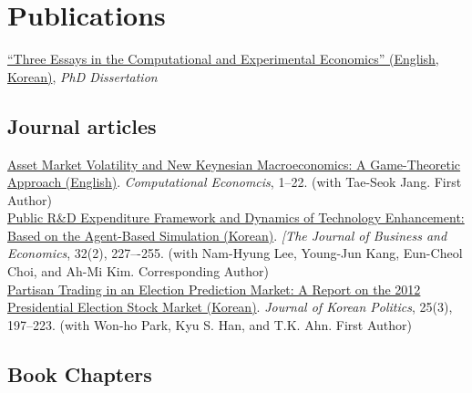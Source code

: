 \documentclass[11pt, a4paper]{article} %
\newcommand{\years}[1]{\marginnote{\scriptsize #1}} %
\begin{document}
%


\section*{Publications}

\years{2012} \href{http://spsm.snu.ac.kr/namun/papers/phDdraft.full.pdf}{``Three Essays in the Computational and Experimental Economics'' (English, Korean)}, \emph{PhD Dissertation}\\

\subsection*{Journal articles}

\years{2017} \href{https://link.springer.com/article/10.1007/s10614-017-9705-5}{Asset Market Volatility and New Keynesian Macroeconomics: A Game-Theoretic Approach (English)}. \emph{Computational Economcis}, 1--22. (with Tae-Seok Jang. First Author)\\
\years{2016} \href{http://www.earticle.net/article.aspx?sn=278619}{Public R\&D Expenditure Framework and Dynamics of Technology Enhancement: Based on the Agent-Based Simulation (Korean)}. \emph{[The Journal of Business and Economics}, 32(2), 227–-255. (with Nam-Hyung Lee, Young-Jun Kang, Eun-Cheol Choi, and Ah-Mi Kim. Corresponding Author)\\
\years{2016}\href{https://www.kci.go.kr/kciportal/ci/sereArticleSearch/ciSereArtiView.kci?sereArticleSearchBean.artiId=ART002164687}{Partisan Trading in an Election Prediction Market: A Report on the 2012 Presidential Election Stock Market (Korean)}. \emph{Journal of Korean Politics}, 25(3), 197--223. (with Won-ho Park, Kyu S. Han, and T.K. Ahn. First Author)
%




\subsection*{Book Chapters}
\end{document}
